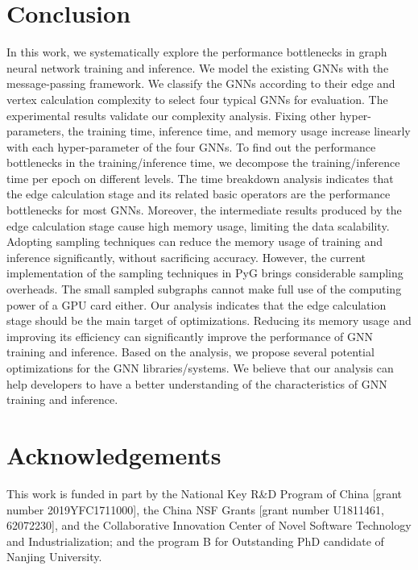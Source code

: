 \section{Conclusion}
\label{sec:conclusion}

In this work, we systematically explore the performance bottlenecks in graph neural network training and inference.
%
We model the existing GNNs with the message-passing framework. 
%
We classify the GNNs according to their edge and vertex calculation complexity to select four typical GNNs for evaluation. 
%
The experimental results validate our complexity analysis.
%
Fixing other hyper-parameters, the training time, inference time, and memory usage increase linearly with each hyper-parameter of the four GNNs.
%
To find out the performance bottlenecks in the training/inference time, we decompose the training/inference time per epoch on different levels.
%
The time breakdown analysis indicates that the edge calculation stage and its related basic operators are the performance bottlenecks for most GNNs.
%
Moreover, the intermediate results produced by the edge calculation stage cause high memory usage, limiting the data scalability.
%
Adopting sampling techniques can reduce the memory usage of training and inference significantly, without sacrificing accuracy. 
%
However, the current implementation of the sampling techniques in PyG brings considerable sampling overheads.
%
The small sampled subgraphs cannot make full use of the computing power of a GPU card either.
% 
Our analysis indicates that the edge calculation stage should be the main target of optimizations.
%
Reducing its memory usage and improving its efficiency can significantly improve the performance of GNN training and inference.
%
Based on the analysis, we propose several potential optimizations for the GNN libraries/systems.
%
We believe that our analysis can help developers to have a better understanding of the characteristics of GNN training and inference.

\section*{Acknowledgements}

This work is funded in part by the National Key R\&D Program of China [grant number 2019YFC1711000], the China NSF Grants [grant number U1811461, 62072230], and the Collaborative Innovation Center of Novel Software Technology and Industrialization; and the program B for Outstanding PhD candidate of Nanjing University.
